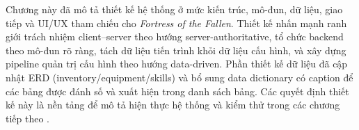 Chương này đã mô tả thiết kế hệ thống ở mức kiến trúc, mô-đun, dữ liệu, giao tiếp và UI/\allowbreak UX tham chiếu cho \textit{Fortress of the Fallen}. Thiết kế nhấn mạnh ranh giới trách nhiệm client--server theo hướng server-authoritative, tổ chức backend theo mô-đun rõ ràng, tách dữ liệu tiến trình khỏi dữ liệu cấu hình, và xây dựng pipeline quản trị cấu hình theo hướng data-driven. Phần thiết kế dữ liệu đã cập nhật ERD (inventory/\allowbreak equipment/\allowbreak skills) và bổ sung data dictionary có caption để các bảng được đánh số và xuất hiện trong danh sách bảng. Các quyết định thiết kế này là nền tảng để mô tả hiện thực hệ thống và kiểm thử trong các chương tiếp theo \cite{nest-docs,mongodb-guide,redis-in-action,gaffer-networking,moriarty-networked}.
